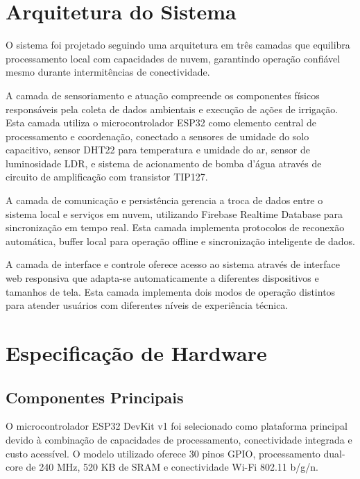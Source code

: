 \documentclass[twoside,english,brazilian]{UNISINOSmonografia}
\begin{document}

\section{Arquitetura do Sistema}

O sistema foi projetado seguindo uma arquitetura em três camadas que equilibra processamento local com capacidades de nuvem, garantindo operação confiável mesmo durante intermitências de conectividade.

A camada de sensoriamento e atuação compreende os componentes físicos responsáveis pela coleta de dados ambientais e execução de ações de irrigação. Esta camada utiliza o microcontrolador ESP32 como elemento central de processamento e coordenação, conectado a sensores de umidade do solo capacitivo, sensor DHT22 para temperatura e umidade do ar, sensor de luminosidade LDR, e sistema de acionamento de bomba d'água através de circuito de amplificação com transistor TIP127.

A camada de comunicação e persistência gerencia a troca de dados entre o sistema local e serviços em nuvem, utilizando Firebase Realtime Database para sincronização em tempo real. Esta camada implementa protocolos de reconexão automática, buffer local para operação offline e sincronização inteligente de dados.

A camada de interface e controle oferece acesso ao sistema através de interface web responsiva que adapta-se automaticamente a diferentes dispositivos e tamanhos de tela. Esta camada implementa dois modos de operação distintos para atender usuários com diferentes níveis de experiência técnica.

\section{Especificação de Hardware}

\subsection{Componentes Principais}

O microcontrolador ESP32 DevKit v1 foi selecionado como plataforma principal devido à combinação de capacidades de processamento, conectividade integrada e custo acessível. O modelo utilizado oferece 30 pinos GPIO, processamento dual-core de 240 MHz, 520 KB de SRAM e conectividade Wi-Fi 802.11 b/g/n.
\end{document}
